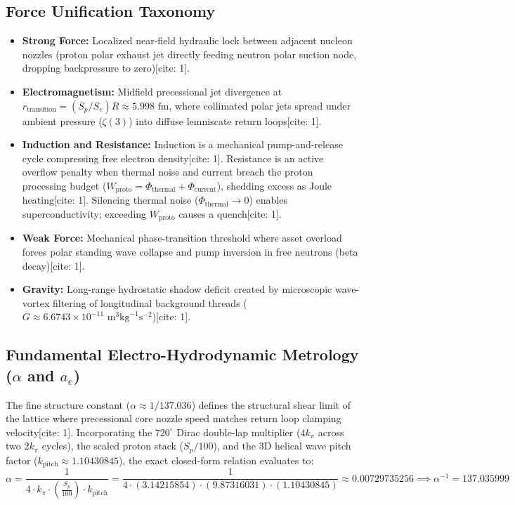 \documentclass[11pt,a4paper]{article}
\begin{document}
	\subsection{Force Unification Taxonomy}
	\begin{itemize}
		\item \textbf{Strong Force:} Localized near-field hydraulic lock between adjacent nucleon nozzles (proton polar exhaust jet directly feeding neutron polar suction node, dropping backpressure to zero)[cite: 1].
		\item \textbf{Electromagnetism:} Midfield precessional jet divergence at $r_{\text{transition}} = (S_p/S_e)R \approx 5.998\text{ fm}$, where collimated polar jets spread under ambient pressure ($\zeta(3)$) into diffuse lemniscate return loops[cite: 1].
		\item \textbf{Induction and Resistance:} Induction is a mechanical pump-and-release cycle compressing free electron density[cite: 1]. Resistance is an active overflow penalty when thermal noise and current breach the proton processing budget ($W_{\text{proto}} = \Phi_{\text{thermal}} + \Phi_{\text{current}}$), shedding excess as Joule heating[cite: 1]. Silencing thermal noise ($\Phi_{\text{thermal}} \to 0$) enables superconductivity; exceeding $W_{\text{proto}}$ causes a quench[cite: 1].
		\item \textbf{Weak Force:} Mechanical phase-transition threshold where asset overload forces polar standing wave collapse and pump inversion in free neutrons (beta decay)[cite: 1].
		\item \textbf{Gravity:} Long-range hydrostatic shadow deficit created by microscopic wave-vortex filtering of longitudinal background threads ($G \approx 6.6743 \times 10^{-11}\text{ m}^3\text{kg}^{-1}\text{s}^{-2}$)[cite: 1].
	\end{itemize}
	
	\subsection{\texorpdfstring{Fundamental Electro-Hydrodynamic Metrology ($\alpha$ and $a_e$)}{Fundamental Electro-Hydrodynamic Metrology (\alpha and a\_e)}}
	The fine structure constant ($\alpha \approx 1/137.036$) defines the structural shear limit of the lattice where precessional core nozzle speed matches return loop clamping velocity[cite: 1]. Incorporating the $720^\circ$ Dirac double-lap multiplier ($4k_\pi$ across two $2k_\pi$ cycles), the scaled proton stack ($S_p/100$), and the 3D helical wave pitch factor ($k_{\text{pitch}} \approx 1.10430845$), the exact closed-form relation evaluates to:
	\begin{equation}
		\alpha = \frac{1}{4 \cdot k_\pi \cdot \left(\frac{S_p}{100}\right) \cdot k_{\text{pitch}}} = \frac{1}{4 \cdot (3.14215854) \cdot (9.87316031) \cdot (1.10430845)} \approx 0.00729735256 \implies \alpha^{-1} = 137.035999
	\end{equation}
	
\end{document}
